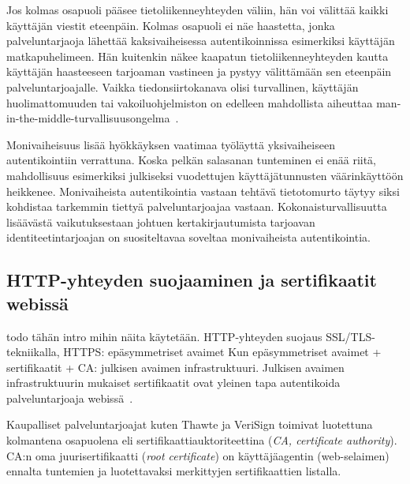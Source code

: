 \documentclass[finnish,gradu]{tktltiki}
\begin{document}
  Jos kolmas osapuoli pääsee tietoliikenneyhteyden väliin, hän voi välittää kaikki käyttäjän viestit eteenpäin. Kolmas osapuoli ei näe haastetta, jonka palveluntarjaoja lähettää kaksivaiheisessa autentikoinnissa esimerkiksi käyttäjän matkapuhelimeen. Hän kuitenkin näkee kaapatun tietoliikenneyhteyden kautta käyttäjän haasteeseen tarjoaman vastineen ja pystyy välittämään sen eteenpäin palveluntarjoajalle. Vaikka tiedonsiirtokanava olisi turvallinen, käyttäjän huolimattomuuden tai vakoiluohjelmiston on edelleen mahdollista aiheuttaa man-in-the-middle-turvallisuusongelma~\cite{schneier_2factor_2012}.

  Monivaiheisuus lisää hyökkäyksen vaatimaa työläyttä yksivaiheiseen autentikointiin verrattuna. Koska pelkän salasanan tunteminen ei enää riitä, mahdollisuus esimerkiksi julkiseksi vuodettujen käyttäjätunnusten väärinkäyttöön heikkenee. Monivaiheista autentikointia vastaan tehtävä tietotomurto täytyy siksi kohdistaa tarkemmin tiettyä palveluntarjoajaa vastaan. Kokonaisturvallisuutta lisäävästä vaikutuksestaan johtuen kertakirjautumista tarjoavan identiteetintarjoajan on suositeltavaa soveltaa monivaiheista autentikointia.




  \subsection{HTTP-yhteyden suojaaminen ja sertifikaatit webissä} %
  \label{sub:sertifikaatit_webissä}
  todo tähän intro mihin näita käytetään.
  HTTP-yhteyden suojaus SSL/TLS-tekniikalla, HTTPS: epäsymmetriset avaimet
  Kun epäsymmetriset avaimet + sertifikaatit + CA: julkisen avaimen infrastruktuuri.
  Julkisen avaimen infrastruktuurin mukaiset sertifikaatit ovat yleinen tapa autentikoida palveluntarjoaja webissä~\cite{id_in_federation_systems_2005}.

  Kaupalliset palveluntarjoajat kuten Thawte ja VeriSign toimivat luotettuna kolmantena osapuolena eli sertifikaattiauktoriteettina (\emph{CA, certificate authority}). CA:n oma juurisertifikaatti (\emph{root certificate}) on käyttäjäagentin (web-selaimen) ennalta tuntemien ja luotettavaksi merkittyjen sertifikaattien listalla.
\end{document}
